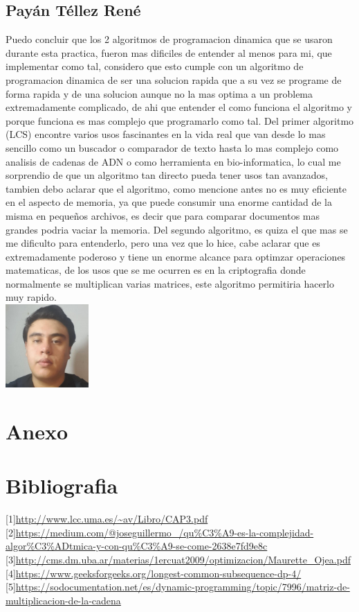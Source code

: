\documentclass[spanish]{article}
\begin{document}
	\subsection{Payán Téllez René}
	Puedo concluir que los 2 algoritmos de programacion dinamica que se usaron durante esta practica, fueron mas dificiles de entender al menos para mi, que implementar como tal, considero que esto cumple con un algoritmo de programacion dinamica de ser una solucion rapida que a su vez se programe de forma rapida y de una solucion aunque no la mas optima a un problema extremadamente complicado, de ahi que entender el como funciona el algoritmo y porque funciona es mas complejo que programarlo como tal. Del primer algoritmo (LCS) encontre varios usos fascinantes en la vida real que van desde lo mas sencillo como un buscador o comparador de texto hasta lo mas complejo como analisis de cadenas de ADN o como herramienta en bio-informatica, lo cual me sorprendio de que un algoritmo tan directo pueda tener usos tan avanzados, tambien debo aclarar que el algoritmo, como mencione antes no es muy eficiente en el aspecto de memoria, ya que puede consumir una enorme cantidad de la misma en pequeños archivos, es decir que para comparar documentos mas grandes podria vaciar la memoria. Del segundo algoritmo, es quiza el que mas se me dificulto para entenderlo, pero una vez que lo hice, cabe aclarar que es extremadamente poderoso y tiene un enorme alcance para optimzar operaciones matematicas, de los usos que se me ocurren es en la criptografia donde normalmente se multiplican varias matrices, este algoritmo permitiria hacerlo muy rapido.\\
	\includegraphics[height=120px,width=120px]{Rene}
	\section{Anexo}			
	\section{Bibliografia}
	{[}1{]}\url{http://www.lcc.uma.es/~av/Libro/CAP3.pdf}\\
	{[}2{]}\url{https://medium.com/@joseguillermo_/qu\%C3\%A9-es-la-complejidad-algor\%C3\%ADtmica-y-con-qu\%C3\%A9-se-come-2638e7fd9e8c}\\
	{[}3{]}\url{http://cms.dm.uba.ar/materias/1ercuat2009/optimizacion/Maurette_Ojea.pdf}\\
	{[}4{]}\url{https://www.geeksforgeeks.org/longest-common-subsequence-dp-4/}\\
	{[}5{]}\url{https://sodocumentation.net/es/dynamic-programming/topic/7996/matriz-de-multiplicacion-de-la-cadena}\\
\end{document}
